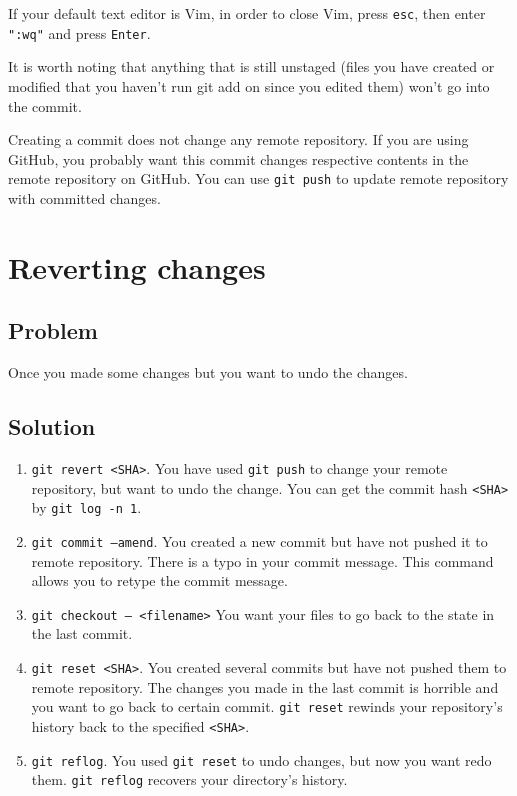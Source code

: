 \documentclass[12pt]{report}
\newcommand\code[1]{{\color{blue}\texttt{#1}}}
\begin{document}
If your default text editor is Vim, in order to close Vim, press \code{esc}, then enter \code{":wq"} and press \code{Enter}.

It is worth noting that anything that is still unstaged (files you have created or modified that you haven’t run git add on since you edited them) won’t go into the commit. 

Creating a commit does not change any remote repository. If you are using GitHub, you probably want this commit changes respective contents in the remote repository on GitHub. You can use \code{git push} to update remote repository with committed changes.


\section{Reverting changes}

\subsection*{Problem}

Once you made some changes but you want to undo the changes.

\subsection*{Solution}

\begin{enumerate}
  \item \code{git revert <SHA>}. You have used \code{git push} to change your remote repository, but want to undo the change. You can get the commit hash \code{<SHA>} by \code{git log -n 1}.
  \item \code{git commit --amend}. You created a new commit but have not pushed it to remote repository. There is a typo in your commit message. This command allows you to retype the commit message.
  \item \code{git checkout -- <filename>} You want your files to go back to the state in the last commit.
  \item \code{git reset <SHA>}. You created several commits but have not pushed them to remote repository. The changes you made in the last commit is horrible and you want to go back to certain commit. \code{git reset} rewinds your repository's history back to the specified \code{<SHA>}.
  \item \code{git reflog}. You used \code{git reset} to undo changes, but now you want redo them. \code{git reflog} recovers your directory's history.
\end{enumerate}
\end{document}
